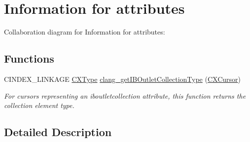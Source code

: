 \hypertarget{group__CINDEX__ATTRIBUTES}{}\section{Information for attributes}
\label{group__CINDEX__ATTRIBUTES}
Collaboration diagram for Information for attributes\+:
\subsection*{Functions}
\begin{DoxyCompactItemize}
\item 
\mbox{\label{group__CINDEX__ATTRIBUTES_ga93c2c27353ae1a5d56303d09ec8ca1c2}} 
C\+I\+N\+D\+E\+X\+\_\+\+L\+I\+N\+K\+A\+GE \hyperlink{structCXType}{C\+X\+Type} \hyperlink{group__CINDEX__ATTRIBUTES_ga93c2c27353ae1a5d56303d09ec8ca1c2}{clang\+\_\+get\+I\+B\+Outlet\+Collection\+Type} (\hyperlink{structCXCursor}{C\+X\+Cursor})
\begin{DoxyCompactList}\small\item\em For cursors representing an iboutletcollection attribute, this function returns the collection element type. \end{DoxyCompactList}\end{DoxyCompactItemize}


\subsection{Detailed Description}
